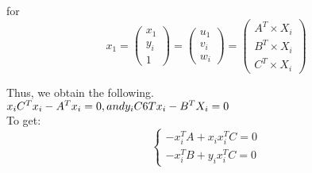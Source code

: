 \documentclass[12pt]{article}
\begin{document}
\noindent for\\
\[x_{1} = 
\begin{pmatrix}
x_{1}\\
y_{i}\\
1
\end{pmatrix} = 
\begin{pmatrix}
u_{1}\\
v_{i}\\
w_{i}
\end{pmatrix} = 
\begin{pmatrix}
A^{T} \times X_{i}\\
B^{T} \times X_{i}\\
C^{T} \times X_{i}
\end{pmatrix}
\]

\noindent Thus, we obtain the following.\\
$x_{i}C^{T}x_{i}-A^{T}x_{i} = 0, \\
and \\
y_{i}C6{T}x_{i} - B^{T}X_{i} = 0$\\

\noindent To get:
\[
\left\{
    \begin{array}{l}
        -x_{i}^{T}A + x_{i}x_{i}^{T}C = 0 \\
        -x_{i}^{T}B + y_{i}x_{i}^{T}C = 0
    \end{array}
\right.
\]
\end{document}
